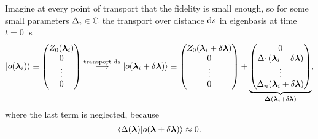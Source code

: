 


Imagine at every point of transport that the fidelity is small enough, so for some small parameters $\Delta_i\in \mathbb{C}$ the transport over distance $\mathrm{d} s$ in eigenbasis at time $t=0$ is
$$\ket{o({\bm\lambda}_i)}\equiv \begin{pmatrix}
    Z_0({\bm\lambda}_i)\\
    0\\
    \vdots \\
    0
\end{pmatrix} \overset{\text{transport }\mathrm{d} s}{\longrightarrow} \ket{o({\bm\lambda}_i+\delta {\bm\lambda})}\equiv\begin{pmatrix}
    Z_0({\bm\lambda}_i+\delta {\bm\lambda})\\
    0\\
    \vdots \\
    0
\end{pmatrix} +\underbrace{\begin{pmatrix}
    0\\
    \Delta_1({\bm\lambda}_i+\delta {\bm\lambda})\\
    \vdots \\
    \Delta_n({\bm\lambda}_i+\delta {\bm\lambda})
\end{pmatrix}}_{\mathbf{\Delta}({\bm\lambda}_i+\delta {\bm\lambda})}, $$
where the last term is neglected, because
$$\braket{\Delta({\bm\lambda})|o({\bm\lambda}+\delta{\bm\lambda})}\approx 0.$$

